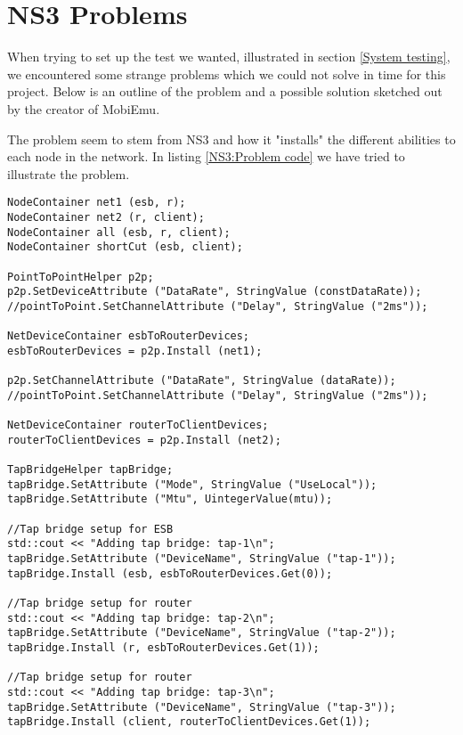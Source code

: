 \section{NS3 Problems}\label{NS3 Problems}
	When trying to set up the test we wanted, illustrated in section \ref{System testing}, we encountered some strange problems which we could not solve in time for this project. Below is an outline of the problem and a possible solution sketched out by the creator of \gls{MobiEmu}.
	
	The problem seem to stem from NS3 and how it "installs" the different abilities to each node in the network. In listing \ref{NS3:Problem code} we have tried to illustrate the problem.
	
\lstset{language=C++, style=eclipse}
\begin{lstlisting}[frame=single, caption={This code snippet does not work}, label=NS3:Problem code, breaklines=true]
NodeContainer net1 (esb, r);
NodeContainer net2 (r, client);
NodeContainer all (esb, r, client);
NodeContainer shortCut (esb, client);

PointToPointHelper p2p;
p2p.SetDeviceAttribute ("DataRate", StringValue (constDataRate));
//pointToPoint.SetChannelAttribute ("Delay", StringValue ("2ms"));

NetDeviceContainer esbToRouterDevices;
esbToRouterDevices = p2p.Install (net1);

p2p.SetChannelAttribute ("DataRate", StringValue (dataRate));
//pointToPoint.SetChannelAttribute ("Delay", StringValue ("2ms"));

NetDeviceContainer routerToClientDevices;
routerToClientDevices = p2p.Install (net2);

TapBridgeHelper tapBridge;
tapBridge.SetAttribute ("Mode", StringValue ("UseLocal"));
tapBridge.SetAttribute ("Mtu", UintegerValue(mtu)); 

//Tap bridge setup for ESB
std::cout << "Adding tap bridge: tap-1\n";
tapBridge.SetAttribute ("DeviceName", StringValue ("tap-1"));
tapBridge.Install (esb, esbToRouterDevices.Get(0));

//Tap bridge setup for router
std::cout << "Adding tap bridge: tap-2\n";
tapBridge.SetAttribute ("DeviceName", StringValue ("tap-2"));
tapBridge.Install (r, esbToRouterDevices.Get(1));

//Tap bridge setup for router
std::cout << "Adding tap bridge: tap-3\n";
tapBridge.SetAttribute ("DeviceName", StringValue ("tap-3"));
tapBridge.Install (client, routerToClientDevices.Get(1));
\end{lstlisting}
	
